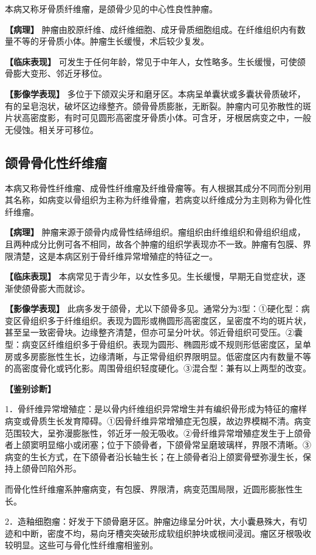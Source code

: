 本病又称牙骨质纤维瘤，是颌骨少见的中心性良性肿瘤。

\textbf{【病理】}
肿瘤由胶原纤维、成纤维细胞、成牙骨质细胞组成。在纤维组织内有数量不等的牙骨质小体。肿瘤生长缓慢，术后较少复发。

\textbf{【临床表现】}
可发生于任何年龄，常见于中年人，女性略多。生长缓慢，可使颌骨膨大变形、邻近牙移位。

\textbf{【影像学表现】}
多位于下颌双尖牙和磨牙区。本病呈单囊状或多囊状骨质破坏，有的呈皂泡状，破坏区边缘整齐。颌骨骨质膨胀，无断裂。肿瘤内可见弥散性的斑片状高密度影，有时可见圆形高密度牙骨质小体。可含牙，牙根居病变之中，一般无侵蚀。相关牙可移位。

\subsection{颌骨骨化性纤维瘤}

本病又称骨性纤维瘤、成骨性纤维瘤及纤维骨瘤等。有人根据其成分不同而分别用其名称，如病变以骨组织为主称为纤维骨瘤，若病变以纤维成分为主则称为骨化性纤维瘤。

\textbf{【病理】}
肿瘤来源于颌骨内成骨性结缔组织。瘤组织由纤维组织和骨组织组成，且两种成分比例可各不相同，故各个肿瘤的组织学表现亦不一致。肿瘤有包膜、界限清楚，这是本病区别于骨纤维异常增殖症的特征之一。

\textbf{【临床表现】}
本病常见于青少年，以女性多见。生长缓慢，早期无自觉症状，逐渐使颌骨膨大而就诊。

\textbf{【影像学表现】}
此病多发于颌骨，尤以下颌骨多见。通常分为3型：①硬化型：病变区骨组织多于纤维组织。表现为圆形或椭圆形高密度区，呈密度不均的斑片状，甚至呈一致密骨块。边缘整齐清楚，但亦可呈分叶状。邻近骨组织可受压。②囊型：病变区纤维组织多于骨组织。表现为圆形、椭圆形或不规则形低密度区，呈单房或多房膨胀性生长，边缘清晰，与正常骨组织界限明显。低密度区内有数量不等的高密度骨化或钙化影。周围骨组织轻度硬化。③混合型：兼有以上两型的改变。

\textbf{【鉴别诊断】}

1．骨纤维异常增殖症：是以骨内纤维组织异常增生并有编织骨形成为特征的瘤样病变或骨质生长发育障碍。①因骨纤维异常增殖症无包膜，故边界模糊不清。病变范围较大，呈弥漫膨胀性，邻近牙一般无吸收。②骨纤维异常增殖症发生于上颌骨者上颌窦明显缩小或闭塞；位于下颌骨者，下颌骨常呈磨玻璃样，界限不清晰。③病变的生长方式，在下颌骨者沿长轴生长；在上颌骨者沿上颌窦骨壁弥漫生长，保持上颌骨凹陷外形。

而骨化性纤维瘤系肿瘤病变，有包膜、界限清，病变范围局限，近圆形膨胀性生长。

2．造釉细胞瘤：好发于下颌骨磨牙区。肿瘤边缘呈分叶状，大小囊悬殊大，有切迹和中断，密度不均，易向牙槽突突破形成软组织肿块或根间浸润。瘤区牙根吸收较明显。这些可与骨化性纤维瘤相鉴别。

